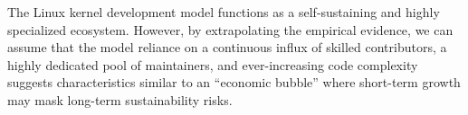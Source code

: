 The Linux kernel development model functions as a self-sustaining and highly specialized ecosystem. However, by extrapolating the empirical evidence, we can assume that the model reliance on a continuous influx of skilled contributors, a highly dedicated pool of maintainers, and ever-increasing code complexity suggests characteristics similar to an ``economic bubble'' where short-term growth may mask long-term sustainability risks.
